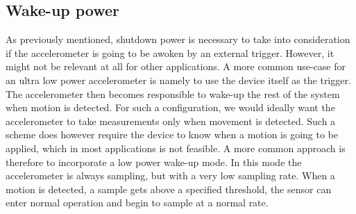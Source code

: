 
\subsection{Wake-up power}

As previously mentioned, shutdown power is necessary to take into consideration if the accelerometer is going to be awoken by an external trigger. However, it might not be relevant at all for other applications. A more common use-case for an ultra low power accelerometer is namely to use the device itself as the trigger. The accelerometer then becomes responsible to wake-up the rest of the system when motion is detected. For such a configuration, we would ideally want the accelerometer to take measurements only when movement is detected. Such a scheme does however require the device to know when a motion is going to be applied, which in most applications is not feasible. A more common approach is therefore to incorporate a low power wake-up mode. In this mode the accelerometer is always sampling, but with a very low sampling rate. When a motion is detected, a sample gets above a specified threshold, the sensor can enter normal operation and begin to sample at a normal rate. 

